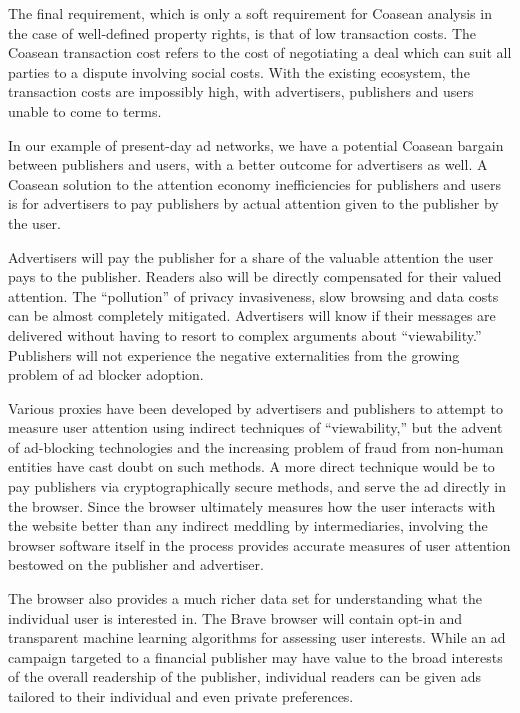 \documentclass[11pt]{article}
\begin{document}
The final requirement, which is only a soft requirement for Coasean
analysis in the case of well-defined property rights, is that of low
transaction costs. The Coasean transaction cost refers to the cost of
negotiating a deal which can suit all parties to a dispute involving
social costs. With the existing ecosystem, the transaction costs are
impossibly high, with advertisers, publishers and users unable to come
to terms. 

In our example of present-day ad networks, we have a potential Coasean
bargain between publishers and users, with a better outcome for
advertisers as well. A Coasean solution to the attention economy
inefficiencies for publishers and users is for advertisers to pay
publishers by actual attention given to the publisher by the user. 

Advertisers will pay the publisher for a share of the valuable
attention the user pays to the publisher. Readers also will be
directly compensated for their valued attention. The ``pollution'' of privacy invasiveness, slow browsing and data costs can be almost completely mitigated. Advertisers will know if their messages are delivered without having to resort to complex arguments about 
``viewability.'' Publishers will not experience the negative
externalities from the growing problem of ad blocker adoption. 

Various proxies have been developed by advertisers and publishers to
attempt to measure user attention using indirect techniques of
``viewability,'' but the advent of ad-blocking technologies and the
increasing problem of fraud from non-human entities have cast doubt on
such methods. A more direct technique would be to pay publishers via
cryptographically secure methods, and serve the ad directly in the
browser. Since the browser ultimately measures how the user interacts
with the website better than any indirect meddling by intermediaries,
involving the browser software itself in the process provides accurate
measures of user attention bestowed on the publisher and advertiser. 

The browser also provides a much richer data set for understanding
what the individual user is interested in. The Brave browser will
contain opt-in and transparent machine learning algorithms for
assessing user interests. While an ad campaign targeted to a financial
publisher may have value to the broad interests of the overall
readership of the publisher, individual readers can be given ads
tailored to their individual and even private preferences. 
\end{document}
